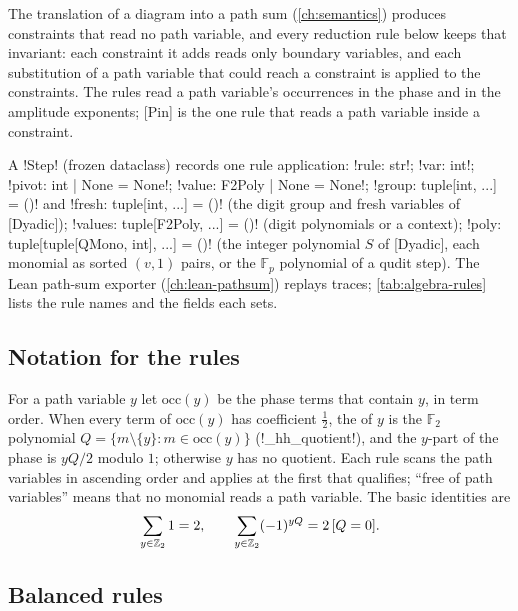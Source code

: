The translation of a diagram into a path sum (\cref{ch:semantics}) produces constraints that read no path variable, and every reduction rule below keeps that invariant: each constraint it adds reads only boundary variables, and each substitution of a path variable that could reach a constraint is applied to the constraints. The rules read a path variable's occurrences in the phase and in the amplitude exponents; [Pin] is the one rule that reads a path variable inside a constraint.

\begin{definition}[Step]\label{def:algebra-step}
A \py!Step! (frozen dataclass) records one rule application: \py!rule: str!; \py!var: int!; \py!pivot: int | None = None!; \py!value: F2Poly | None = None!; \py!group: tuple[int, ...] = ()! and \py!fresh: tuple[int, ...] = ()! (the digit group and fresh variables of [Dyadic]); \py!values: tuple[F2Poly, ...] = ()! (digit polynomials or a context); \py!poly: tuple[tuple[QMono, int], ...] = ()! (the integer polynomial $S$ of [Dyadic], each monomial as sorted $(v,1)$ pairs, or the $\mathbb{F}_p$ polynomial of a qudit step). The Lean path-sum exporter (\cref{ch:lean-pathsum}) replays traces; \cref{tab:algebra-rules} lists the rule names and the fields each sets.
\end{definition}

\subsection{Notation for the rules}

For a path variable $y$ let $\mathrm{occ}(y)$ be the phase terms that contain $y$, in term order. When every term of $\mathrm{occ}(y)$ has coefficient $\tfrac12$, the  of $y$ is the $\mathbb{F}_2$ polynomial $Q=\{m\setminus\{y\}:m\in\mathrm{occ}(y)\}$ (\py!_hh_quotient!), and the $y$-part of the phase is $yQ/2$ modulo $1$; otherwise $y$ has no quotient. Each rule scans the path variables in ascending order and applies at the first that qualifies; ``free of path variables'' means that no monomial reads a path variable. The basic identities are
\begin{equation}\label{eq:algebra-hh}
\sum_{y\in\mathbb{Z}_{2}}1=2,\qquad \sum_{y\in\mathbb{Z}_{2}}(-1)^{yQ}=2\,[Q=0].
\end{equation}

\subsection{Balanced rules}

